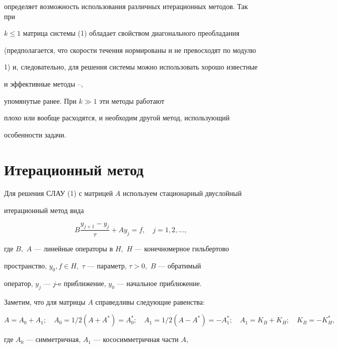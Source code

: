 определяет возможность использования различных итерационных методов. Так при 


$k\le 1$ матрица системы (1) обладает свойством диагонального преобладания 


(предполагается, что скорости течения нормированы и не превосходят по модулю 


1) и, следовательно, для решения системы можно использовать хорошо известные 


и эффективные методы \cite{Sam}--\cite{Ha}, 


упомянутые ранее. При $k\gg 1$ эти методы работают 


плохо или вообще расходятся, и необходим другой метод, использующий 


особенности задачи. 


 


\section{Итерационный метод} 


 


Для решения СЛАУ (1) с матрицей $A$ используем стационарный двуслойный 


итерационный метод вида 


\begin{equation} 


B\frac{y_{j+1}-y_j}{\tau}+Ay_j=f,\quad j=1,2,\dotsc , 


\end{equation} 


где $B,$ $A$ --- линейные операторы в $H,$ $H$ --- конечномерное гильбертово 


пространство, $y_0, f\in H,$ $\tau$ --- параметр, $\tau>0,$ $B$ --- обратимый 


оператор, $y_j$ --- $j$-e приближение, $y_0$ --- начальное приближение. 


 


Заметим, что для матрицы $A$ справедливы следующие равенства: 


$$ 


A=A_0+A_1;\quad A_0=1/2(A+A^*)=A^*_0;\quad A_1=1/2(A-A^*)=-A_1^*;\quad 


A_1=K_B+K_H;\quad K_B=-K^*_H, 


$$ 


где $A_0$ --- симметричная, $A_1$ --- кососимметричная части $A,$ 


